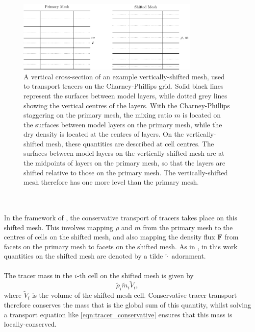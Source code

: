 \documentclass{ametsocV6.1}
\begin{document}
\begin{figure}[h!] 
\centering
\includegraphics[width=0.8\textwidth]{fig_7_shifted_mesh.pdf}
\caption{A vertical cross-section of an example vertically-shifted mesh, used to transport tracers on the Charney-Phillips grid.
Solid black lines represent the surfaces between model layers, while dotted grey lines showing the vertical centres of the layers.
With the Charney-Phillips staggering on the primary mesh, the mixing ratio $m$ is located on the surfaces between model layers on the primary mesh, while the dry density is located at the centres of layers.
On the vertically-shifted mesh, these quantities are described at cell centres.
The surfaces between model layers on the vertically-shifted mesh are at the midpoints of layers on the primary mesh, so that the layers are shifted relative to those on the primary mesh.
The vertically-shifted mesh therefore has one more level than the primary mesh.
} \label{fig:shifted}
\end{figure}
\\
\\
In the framework of \citet{bendall2023solution}, the conservative transport of tracers takes place on this shifted mesh.
This involves mapping $\rho$ and $m$ from the primary mesh to the centres of cells on the shifted mesh, and also mapping the density flux $\bm{F}$ from facets on the primary mesh to facets on the shifted mesh.
As in \citet{bendall2023solution}, in this work quantities on the shifted mesh are denoted by a tilde $\widetilde{\cdot}$ adornment. \\
\\
The tracer mass in the $i$-th cell on the shifted mesh is given by
\begin{equation}
\widetilde{\rho}_i\widetilde{m}_i \widetilde{V}_i,
\end{equation}
where $\widetilde{V}_i$ is the volume of the shifted mesh cell.
Conservative tracer transport therefore conserves the mass that is the global sum of this quantity, whilst solving a transport equation like \eqref{eqn:tracer_conservative} ensures that this mass is locally-conserved.
\end{document}
